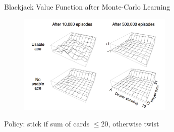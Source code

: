 \bgroup
\begin{frame}{Blackjack Value Function after Monte-Carlo Learning}
\begin{figure}
\centering
\includegraphics[width=0.657\textwidth]{img/blackjack_value.pdf}
\end{figure}
Policy: \textcolor{mImagelabRed}{stick} if sum of cards $\leq$20, otherwise \textcolor{mImagelabRed}{twist}
\end{frame}
\egroup